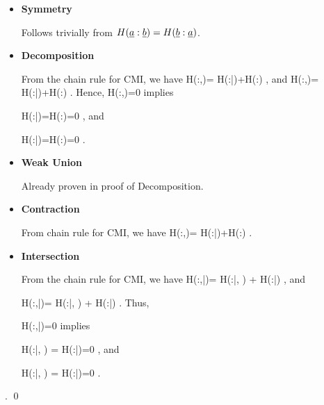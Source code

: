 \begin{itemize}
\item{\bf Symmetry}

Follows trivially from 
$H({\underline{a}}:{\underline{b}})=H({\underline{b}}:{\underline{a}})$.
\item{\bf Decomposition}

From the chain rule for CMI, we have
\beq
H(\rva:\rvb,\rvc)=
H(\rva:\rvb|\rvc)+H(\rva:\rvc)
\;,
\eeq
and
\beq
H(\rva:\rvb,\rvc)=
H(\rva:\rvc|\rvb)+H(\rva:\rvb)
\;.
\eeq
Hence, 
\beq
H(\rva:\rvb,\rvc)=0
\;
\eeq
implies

\beq
H(\rva:\rvb|\rvc)=H(\rva:\rvc)=0
\;,
\eeq
and

\beq
H(\rva:\rvc|\rvb)=H(\rva:\rvb)=0
\;.
\eeq


\item{\bf Weak Union}

Already proven in proof of Decomposition.

\item{\bf Contraction}

From chain rule for CMI, we have
\beq
H(\rva:\rvb,\rvc)=
H(\rva:\rvb|\rvc)+H(\rva:\rvc)
\;.
\eeq
\item{\bf Intersection}

From the chain rule for CMI, we have
\beq
H(\rva:\rvb,\rvd|\rvc)=
H(\rva:\rvb|\rvd, \rvc)
+
H(\rva:\rvd|\rvc)
\;,
\eeq
and

\beq
H(\rva:\rvb,\rvd|\rvc)=
H(\rva:\rvd|\rvb, \rvc)
+
H(\rva:\rvb|\rvc)
\;.
\eeq
Thus,

\beq
H(\rva:\rvb,\rvd|\rvc)=0
\;
\eeq
implies

\beq
H(\rva:\rvb|\rvd, \rvc)
=
H(\rva:\rvd|\rvc)=0
\;,
\eeq
and

\beq
H(\rva:\rvd|\rvb, \rvc)
=
H(\rva:\rvb|\rvc)=0
\;.
\eeq
\end{itemize}
\;.
\qed